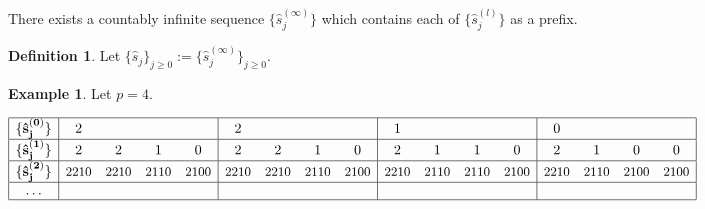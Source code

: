 \documentclass[a4paper]{article}
\theoremstyle{plain}
\theoremstyle{definition}
\newtheorem{definition}{Definition}
\newtheorem*{example}{Example}
\begin{document}
There exists a countably infinite sequence $\{ \hat{s}_j^{(\infty)}\}$ which contains each of $\{ \hat{s}_j^{(l)}\}$ as a prefix.
\begin{definition}
Let $\{\hat{s}_j\}_{j \ge 0} := \{ \hat{s}_j^{(\infty)}\}_{j \ge 0}$.
\end{definition}
\begin{example}
Let $p=4$.

$\begin{array}{|c|cccc|cccc|cccc|cccc|}
\hline
\{ \mathbf{\hat{s}_j^{(0)}}\} & 2 & & & & 2 & & & & 1 & & & & 0 & & & \\
\hline
\{ \mathbf{\hat{s}_j^{(1)}}\} & 2 & 2 & 1 & 0 & 2 & 2 & 1 & 0 & 2 & 1 & 1 & 0 & 2 & 1 & 0 & 0 \\
\hline
\{ \mathbf{\hat{s}_j^{(2)}}\} &
\text{\small{2210}} & \text{\small{2210}} & \text{\small{2110}} & \text{\small{2100}} &
\text{\small{2210}} & \text{\small{2210}} & \text{\small{2110}} & \text{\small{2100}} &
\text{\small{2210}} & \text{\small{2110}} & \text{\small{2110}} & \text{\small{2100}} &
\text{\small{2210}} & \text{\small{2110}} & \text{\small{2100}} & \text{\small{2100}} \\
\hline
 \mathbf{\ldots} & & & & & & & & & & & & & & & & \\
\hline
\end{array} $
\end{example}
\end{document}
